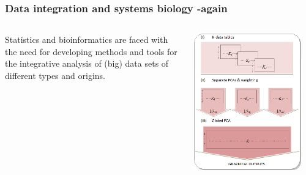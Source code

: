 \documentclass[handout]{beamer}
\begin{document}
\begin{frame}
\frametitle{Data integration and systems biology -again}
\begin{columns}
\begin{column}{.5\linewidth}


Statistics and bioinformatics are faced with the need for developing methods and tools for the integrative analysis of (big) data sets of different types and origins.
\end{column}
 \begin{column}{.5\linewidth}
\begin{center}
\includegraphics[width=0.9\textwidth]{./images/MFA.png}
\end{center}
 \end{column}
\end{columns}

\end{frame}
\end{document}
